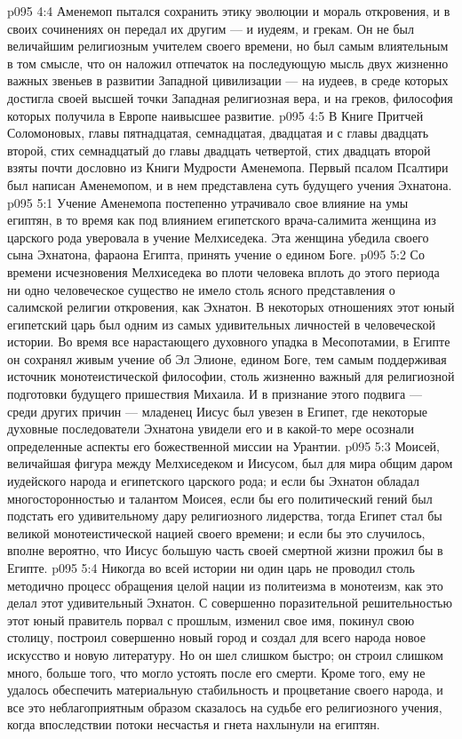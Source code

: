 \vs p095 4:4 Аменемоп пытался сохранить этику эволюции и мораль откровения, и в своих сочинениях он передал их другим --- и иудеям, и грекам. Он не был величайшим религиозным учителем своего времени, но был самым влиятельным в том смысле, что он наложил отпечаток на последующую мысль двух жизненно важных звеньев в развитии Западной цивилизации --- на иудеев, в среде которых достигла своей высшей точки Западная религиозная вера, и на греков, философия которых получила в Европе наивысшее развитие.
\vs p095 4:5 \pc В Книге Притчей Соломоновых, главы пятнадцатая, семнадцатая, двадцатая и с главы двадцать второй, стих семнадцатый до главы двадцать четвертой, стих двадцать второй взяты почти дословно из Книги Мудрости Аменемопа. Первый псалом Псалтири был написан Аменемопом, и в нем представлена суть будущего учения Эхнатона.
\vs p095 5:1 Учение Аменемопа постепенно утрачивало свое влияние на умы египтян, в то время как под влиянием египетского врача\hyp{}салимита женщина из царского рода уверовала в учение Мелхиседека. Эта женщина убедила своего сына Эхнатона, фараона Египта, принять учение о едином Боге.
\vs p095 5:2 Со времени исчезновения Мелхиседека во плоти человека вплоть до этого периода ни одно человеческое существо не имело столь ясного представления о салимской религии откровения, как Эхнатон. В некоторых отношениях этот юный египетский царь был одним из самых удивительных личностей в человеческой истории. Во время все нарастающего духовного упадка в Месопотамии, в Египте он сохранял живым учение об Эл Элионе, едином Боге, тем самым поддерживая источник монотеистической философии, столь жизненно важный для религиозной подготовки будущего пришествия Михаила. И в признание этого подвига --- среди других причин --- младенец Иисус был увезен в Египет, где некоторые духовные последователи Эхнатона увидели его и в какой\hyp{}то мере осознали определенные аспекты его божественной миссии на Урантии.
\vs p095 5:3 Моисей, величайшая фигура между Мелхиседеком и Иисусом, был для мира общим даром иудейского народа и египетского царского рода; и если бы Эхнатон обладал многосторонностью и талантом Моисея, если бы его политический гений был подстать его удивительному дару религиозного лидерства, тогда Египет стал бы великой монотеистической нацией своего времени; и если бы это случилось, вполне вероятно, что Иисус большую часть своей смертной жизни прожил бы в Египте.
\vs p095 5:4 Никогда во всей истории ни один царь не проводил столь методично процесс обращения целой нации из политеизма в монотеизм, как это делал этот удивительный Эхнатон. С совершенно поразительной решительностью этот юный правитель порвал с прошлым, изменил свое имя, покинул свою столицу, построил совершенно новый город и создал для всего народа новое искусство и новую литературу. Но он шел слишком быстро; он строил слишком много, больше того, что могло устоять после его смерти. Кроме того, ему не удалось обеспечить материальную стабильность и процветание своего народа, и все это неблагоприятным образом сказалось на судьбе его религиозного учения, когда впоследствии потоки несчастья и гнета нахлынули на египтян.
